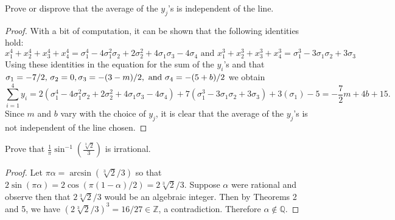 \documentclass[10pt]{amsart}
\begin{document}
\begin{thm}
	Prove or disprove that the average of the $y_j$'s is independent of the line.
	\begin{proof}
	With a bit of computation, it can be shown that the following identities hold:
		$$x_1^4 + x_2^4 + x_3^4 + x_4^4 = \sigma_{1}^{4} - 4 \sigma_{1}^{2} \sigma_{2} + 2 \sigma_{2}^{2} + 4
\sigma_{1} \sigma_{3} - 4 \sigma_{4} \text{ and }
		x_1^3 + x_2^3 + x_3^3 + x_4^3 = \sigma_{1}^{3} - 3 \sigma_{1} \sigma_{2} + 3 \sigma_{3}$$
	Using these identities in the equation for the sum of the $y_i$'s and that $\sigma_1 = -7/2,\, \sigma_2 = 0,\\ \sigma_3 = -(3-m)/2, \text{ and } \sigma_4 = -(5 + b)/2$ we obtain
	$$\sum_{i=1}^4 y_i= 2(\sigma_{1}^{4} - 4 \sigma_{1}^{2} \sigma_{2} + 2 \sigma_{2}^{2} + 4
\sigma_{1} \sigma_{3} - 4 \sigma_{4}) + 7(\sigma_{1}^{3} - 3 \sigma_{1} \sigma_{2} + 3 \sigma_{3}) + 3(\sigma_1) - 5 = -\frac{7}{2} m + 4 b + 15.$$
	Since $m$ and $b$ vary with the choice of $y_j$, it is clear that the average of the $y_j$'s is not independent of the line chosen.

	\end{proof}
\end{thm}

\begin{thm}
	Prove that $\displaystyle{\frac{1}{\pi}\sin^{-1}\left(\frac{\sqrt[3]{2}}{3}\right)}$ is irrational.
	\begin{proof}
	Let $\pi\alpha = \arcsin(\sqrt[3]{2}/3)$ so that $2\sin(\pi\alpha) = 2\cos(\pi(1-\alpha)/2) = 2\sqrt[3]{2}/3$.
	Suppose $\alpha$ were rational and observe then that $2\sqrt[3]{2}/3$ would be an algebraic integer.
	Then by Theorems 2 and 5, we have $(2\sqrt[3]{2}/3)^3 = 16/27 \in \mathbb{Z}$, a contradiction.
	Therefore $\alpha \not \in \mathbb{Q}$.
	
	\end{proof}
\end{thm}
\end{document}
